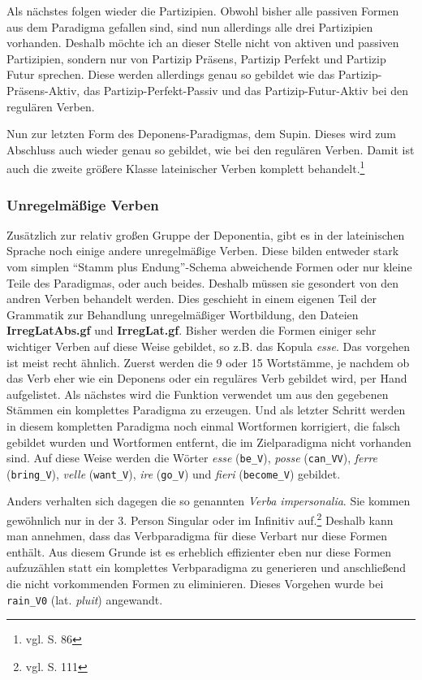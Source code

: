 Als nächstes folgen wieder die Partizipien. Obwohl bisher alle passiven Formen aus dem Paradigma gefallen sind, sind nun allerdings alle drei Partizipien vorhanden. Deshalb möchte ich an dieser Stelle nicht von aktiven und passiven Partizipien, sondern nur von Partizip Präsens, Partizip Perfekt und Partizip Futur sprechen. Diese werden allerdings genau so gebildet wie das Partizip-Präsens-Aktiv, das Partizip-Perfekt-Passiv und das Partizip-Futur-Aktiv bei den regulären Verben. \par
Nun zur letzten Form des Deponens-Paradigmas, dem Supin. Dieses wird zum Abschluss auch wieder genau so gebildet, wie bei den regulären Verben. Damit ist auch die zweite größere Klasse lateinischer Verben komplett behandelt.\footnote{vgl. \cite{BAYER-LINDAUER1994} S. 86} \par
\subsubsection{Unregelmäßige Verben}
Zusätzlich zur relativ großen Gruppe der Deponentia, gibt es in der lateinischen Sprache noch einige andere unregelmäßige Verben. Diese bilden entweder stark vom simplen ``Stamm plus Endung''-Schema abweichende Formen oder nur kleine Teile des Paradigmas, oder auch beides. Deshalb müssen sie gesondert von den andren Verben behandelt werden. Dies geschieht in einem eigenen Teil der Grammatik zur Behandlung unregelmäßiger Wortbildung, den Dateien \textbf{IrregLatAbs.gf} und \textbf{IrregLat.gf}. Bisher werden die Formen einiger sehr wichtiger Verben auf diese Weise gebildet, so z.B. das Kopula \textit{esse}. Das vorgehen ist meist recht ähnlich. Zuerst werden die 9 oder 15 Wortstämme, je nachdem ob das Verb eher wie ein Deponens oder ein reguläres Verb gebildet wird, per Hand aufgelistet. Als nächstes wird die Funktion verwendet um aus den gegebenen Stämmen ein komplettes Paradigma zu erzeugen. Und als letzter Schritt werden in diesem kompletten Paradigma noch einmal Wortformen korrigiert, die falsch gebildet wurden und Wortformen entfernt, die im Zielparadigma nicht vorhanden sind. Auf diese Weise werden die Wörter \textit{esse} (\texttt{be\_V}), \textit{posse} (\texttt{can\_VV}), \textit{ferre} (\texttt{bring\_V}), \textit{velle} (\texttt{want\_V}), \textit{ire} (\texttt{go\_V}) und \textit{fieri} (\texttt{become\_V}) gebildet. \par
Anders verhalten sich dagegen die so genannten \textit{Verba impersonalia}. Sie kommen gewöhnlich nur in der 3. Person Singular oder im Infinitiv auf.\footnote{vgl. \cite{BAYER-LINDAUER1994} S. 111} Deshalb kann man annehmen, dass das Verbparadigma für diese Verbart nur diese Formen enthält. Aus diesem Grunde ist es erheblich effizienter eben nur diese Formen aufzuzählen statt ein komplettes Verbparadigma zu generieren und anschließend die nicht vorkommenden Formen zu eliminieren. Dieses Vorgehen wurde bei \texttt{rain\_V0} (lat. \textit{pluit}) angewandt.
